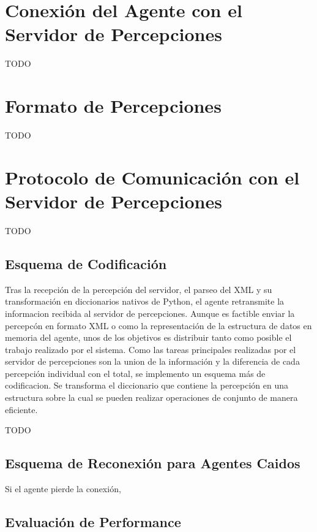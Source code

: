 \section[Conexión con el Percept Server]
{Conexión del Agente con el Servidor de Percepciones}
\label{sec:conexion}

 TODO

\section{Formato de Percepciones}
\label{sec:formato_percepciones}

 TODO

\section[Protocolo del Percept Server]
{Protocolo de Comunicación con el Servidor de Percepciones}
\label{sec:protocolo_perceptserver}

 TODO

\subsection{Esquema de Codificación}
\label{sub:esquema_codificacion}

 Tras la recepción de la percepción del servidor, el parseo del XML y
 su transformación en diccionarios nativos de Python, el agente
 retransmite la informacion recibida al servidor de percepciones.
 Aunque es factible enviar la percepcón en formato XML o como la
 representación de la estructura de datos en memoria del agente, unos
 de los objetivos es distribuir tanto como posible el trabajo realizado
 por el sistema.
 Como las tareas principales realizadas por el servidor de percepciones 
 son la union de la información y la diferencia de cada percepción 
 individual con el total, se implemento un esquema más de codificacion. 
 Se transforma el diccionario que contiene la percepción en una 
 estructura sobre la cual se pueden realizar operaciones de conjunto de 
 manera eficiente. 

 TODO

\subsection{Esquema de Reconexión para Agentes Caidos}
\label{sub:esquema_reconexion}
 
 Si el agente pierde la conexión, 

\subsection{Evaluación de Performance}
\label{sub:evaluacion_performance}
